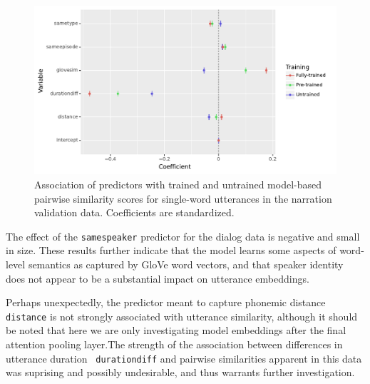 \begin{figure}
  \centering
  \includegraphics[scale=0.66]{results/grsa_narration_coef.pdf}
  \caption{Association of predictors with trained and untrained
    model-based pairwise similarity scores for single-word utterances
    in the narration validation data. Coefficients are standardized.}
  \label{fig:coef_narration}
\end{figure}



The effect of
the {\tt samespeaker} predictor for the dialog data is negative and
small in size.  These results further indicate that the model learns
some aspects of word-level semantics as captured by GloVe word
vectors, and that speaker identity does not appear to be a substantial
impact on utterance embeddings.

Perhaps unexpectedly, the predictor meant to capture phonemic distance
{\tt distance} is not strongly associated with utterance similarity,
although it should be noted that here we are only investigating model
embeddings after the final attention pooling layer.The strength of
the association between differences in utterance duration {\tt
  durationdiff} and pairwise similarities apparent in this data was
suprising and possibly undesirable, and thus warrants further investigation.

